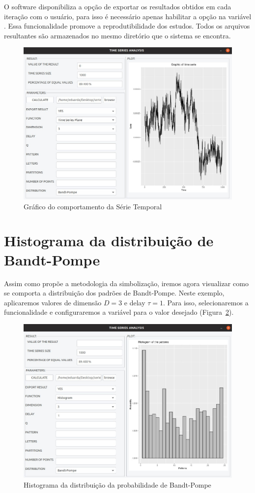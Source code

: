 O software disponibiliza a opção de exportar os resultados obtidos em cada iteração com o usuário, para isso é necessário apenas habilitar a opção na variável . 
Essa funcionalidade promove a reprodutibilidade dos estudos.
Todos os  arquivos resultantes são armazenados no mesmo diretório que o sistema se encontra.


\begin{figure}[H]
	\centering
	\includegraphics[width=0.85\columnwidth]{capitulos/imagens/timeSeriesPlot} 
    \caption{Gráfico do comportamento da Série Temporal}
    \label{fig:TimeSerie}
\end{figure}

\section{Histograma da distribuição de Bandt-Pompe} 

Assim como propõe a metodologia da simbolização, iremos agora visualizar como se comporta a distribuição dos padrões de Bandt-Pompe. Neste exemplo, aplicaremos valores de dimensão $D = 3$ e delay $\tau = 1$. Para isso, selecionaremos a funcionalidade  e configuraremos a variável  para o valor desejado (Figura~\ref{fig:bandtPompe}).

\begin{figure}[H]
	\centering
	\includegraphics[width=0.85\columnwidth]{capitulos/imagens/Histogram} 
    \caption{Histograma da distribuição da probabilidade de Bandt-Pompe}
    \label{fig:bandtPompe}
\end{figure}


